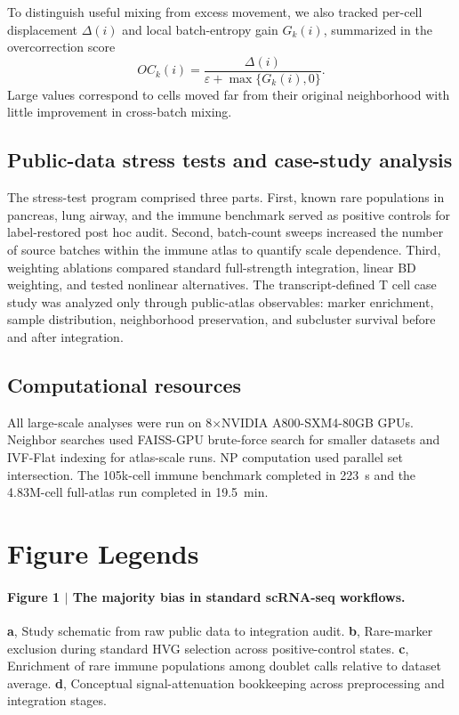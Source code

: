 \documentclass[10pt]{article}
\begin{document}
To distinguish useful mixing from excess movement, we also tracked per-cell displacement $\Delta(i)$ and local batch-entropy gain $G_k(i)$, summarized in the overcorrection score
\begin{equation}
OC_k(i) = \frac{\Delta(i)}{\varepsilon + \max\{G_k(i),0\}}.
\end{equation}
Large values correspond to cells moved far from their original neighborhood with little improvement in cross-batch mixing.

\subsection*{Public-data stress tests and case-study analysis}

The stress-test program comprised three parts. First, known rare populations in pancreas, lung airway, and the immune benchmark served as positive controls for label-restored post hoc audit. Second, batch-count sweeps increased the number of source batches within the immune atlas to quantify scale dependence. Third, weighting ablations compared standard full-strength integration, linear BD weighting, and tested nonlinear alternatives. The transcript-defined T cell case study was analyzed only through public-atlas observables: marker enrichment, sample distribution, neighborhood preservation, and subcluster survival before and after integration.

\subsection*{Computational resources}

All large-scale analyses were run on 8$\times$NVIDIA A800-SXM4-80GB GPUs. Neighbor searches used FAISS-GPU brute-force search for smaller datasets and IVF-Flat indexing for atlas-scale runs.\cite{johnson2022} NP computation used parallel set intersection. The 105k-cell immune benchmark completed in 223~s and the 4.83M-cell full-atlas run completed in 19.5~min.

\section*{Figure Legends}

\paragraph{Figure 1 $|$ The majority bias in standard scRNA-seq workflows.}
\textbf{a}, Study schematic from raw public data to integration audit.
\textbf{b}, Rare-marker exclusion during standard HVG selection across positive-control states.
\textbf{c}, Enrichment of rare immune populations among doublet calls relative to dataset average.
\textbf{d}, Conceptual signal-attenuation bookkeeping across preprocessing and integration stages.
\end{document}
